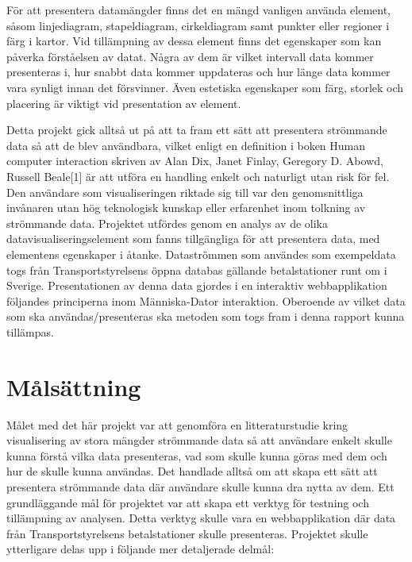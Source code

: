 \documentclass{kththesis}
\begin{document}
För att presentera datamängder finns det en mängd vanligen använda element, såsom linjediagram, stapeldiagram, cirkeldiagram samt punkter eller regioner i färg i kartor. Vid tillämpning av dessa element finns det egenskaper som kan påverka förståelsen av datat. Några av dem är vilket intervall data kommer presenteras i, hur snabbt data kommer uppdateras och hur länge data kommer vara synligt innan det försvinner. Även estetiska egenskaper som färg, storlek och placering är viktigt vid presentation av element. 

Detta projekt gick alltså ut på att ta fram ett sätt att presentera strömmande data så att de blev användbara, vilket enligt en definition i boken Human computer interaction skriven av Alan Dix, Janet Finlay, Geregory D. Abowd, Russell Beale[1] är att utföra en handling enkelt och naturligt utan risk för fel. Den användare som visualiseringen riktade sig till var den genomsnittliga invånaren utan hög teknologisk kunskap eller erfarenhet inom tolkning av strömmande data. Projektet utfördes genom en analys av de olika datavisualiseringselement som fanns tillgängliga för att presentera data, med elementens egenskaper i åtanke. Dataströmmen som användes som exempeldata togs från Transportstyrelsens öppna databas gällande betalstationer runt om i Sverige. Presentationen av denna data gjordes i en interaktiv webbapplikation följandes principerna inom Människa-Dator interaktion. Oberoende av vilket data som ska användas/presenteras ska metoden som togs fram i denna rapport kunna tillämpas.


\section{Målsättning}
Målet med det här projekt var att genomföra en litteraturstudie kring visualisering av stora mängder strömmande data så att användare enkelt skulle kunna förstå vilka data presenteras, vad som skulle kunna göras med dem och hur de skulle kunna användas. Det handlade alltså om att skapa ett sätt att presentera strömmande data där användare skulle kunna dra nytta av dem. Ett grundläggande mål för projektet var att skapa ett verktyg för testning och tillämpning av analysen. Detta verktyg skulle vara en webbapplikation där data från Transportstyrelsens betalstationer skulle presenteras. Projektet skulle ytterligare delas upp i följande mer detaljerade delmål:
\end{document}
